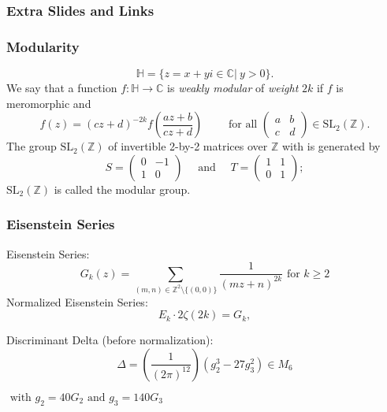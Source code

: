 \begin{frame}
	\frametitle{Extra Slides and Links}
	
	
	
	
\end{frame}

\begin{frame}
	\frametitle{Modularity}
	$$\mathbb{H} = \{z = x+yi \in \mathbb{C} | \ y>0 \}.$$
	We say that a function $f:\mathbb{H} \to \mathbb{C}$ is \textit{weakly modular} of \textit{weight} $2k$ if $f$ is meromorphic and
	$$
	f(z) = (cz+d)^{-2k} f \left( \frac{az+b}{cz+d} \right)
	\qquad \text{ for all }
	\begin{pmatrix} a & b\\
	c & d
	\end{pmatrix}
	\in \text{SL}_2(\mathbb{Z}).
	$$
	The group $\text{SL}_2(\mathbb{Z})$ of invertible 2-by-2 matrices over $\mathbb{Z}$ with  is generated by
	$$
	S = \begin{pmatrix} 0 & -1 \\
	1 &  0
	\end{pmatrix}
	\quad \text{ and } \quad
	T = \begin{pmatrix} 1 & 1 \\
	0 & 1 
	\end{pmatrix};
	$$
	$\text{SL}_2(\mathbb{Z})$ is called the modular group.
\end{frame}

\begin{frame}
	\frametitle{Eisenstein Series}
	Eisenstein Series:
	$$
	G_k(z) = \sum_{(m,n) \in \mathbb{Z}^2\setminus\{(0,0)\}} \frac{1}{(mz+n)^{2k}} \text{ for } k \geq 2
	$$
	Normalized Eisenstein Series:
	$$
	E_k \cdot 2\zeta(2k) = G_k,
	$$
	
	Discriminant Delta (before normalization):
	$$
	\varDelta = \left( \frac{1}{(2\pi)^{12}} \right) (g_2^3 - 27g_3^2) \in M_6
	$$
	\begin{flushright}
		$\text{ with } g_2 = 40G_2 \text{ and } g_3 = 140G_3$
	\end{flushright}
\end{frame}

